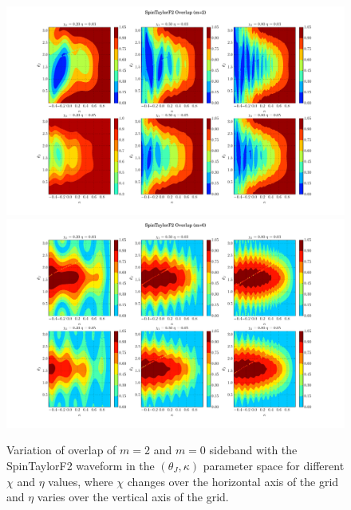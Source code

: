 \label{fig:P2}  \begin{figure}[t]
\includegraphics[width=\textwidth]{./images/OVLP_GRID_P2.pdf}
\includegraphics[width=\textwidth]{./images/OVLP_GRID_P0.pdf} \caption{Variation
of overlap of $m=2$ and $m=0$ sideband with the SpinTaylorF2
waveform in the $(\theta_J, \kappa)$ parameter space for  different $\chi$ and
$\eta$ values, where $\chi$ changes over the horizontal  axis of the grid and
$\eta$ varies over the vertical axis of the grid.}  
\centering  
\end{figure}













































